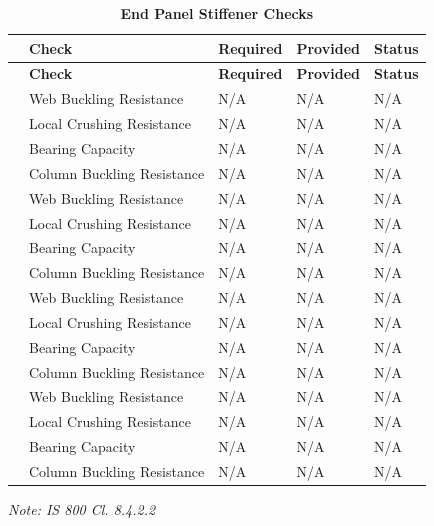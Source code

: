 \documentclass[12pt,a4paper]{report}
\numberwithin{table}{chapter}
\numberwithin{figure}{chapter}
\newcommand{\reportrowpad}{4pt}
\begin{document}
\begin{longtable}{|C{2.5cm}|L{3.5cm}|C{3.5cm}|>{\centering\arraybackslash}p{4.2cm}|C{1.8cm}|}
\caption{\textbf{End Panel Stiffener Checks}}\\
\hline
\textbf{} & \textbf{Check} & \textbf{Required} & \textbf{Provided} & \textbf{Status} \\[\reportrowpad]
\hline
\endfirsthead
\hline
\textbf{} & \textbf{Check} & \textbf{Required} & \textbf{Provided} & \textbf{Status} \\[\reportrowpad]
\hline
\endhead
{} & Web Buckling Resistance & N/A & N/A & N/A \\[\reportrowpad]
 & Local Crushing Resistance & N/A & N/A & N/A \\[\reportrowpad]
 & Bearing Capacity & N/A & N/A & N/A \\[\reportrowpad]
 & Column Buckling Resistance & N/A & N/A & N/A \\[\reportrowpad]
\hline
{} & Web Buckling Resistance & N/A & N/A & N/A \\[\reportrowpad]
 & Local Crushing Resistance & N/A & N/A & N/A \\[\reportrowpad]
 & Bearing Capacity & N/A & N/A & N/A \\[\reportrowpad]
 & Column Buckling Resistance & N/A & N/A & N/A \\[\reportrowpad]
\hline
{} & Web Buckling Resistance & N/A & N/A & N/A \\[\reportrowpad]
 & Local Crushing Resistance & N/A & N/A & N/A \\[\reportrowpad]
 & Bearing Capacity & N/A & N/A & N/A \\[\reportrowpad]
 & Column Buckling Resistance & N/A & N/A & N/A \\[\reportrowpad]
\hline
{} & Web Buckling Resistance & N/A & N/A & N/A \\[\reportrowpad]
 & Local Crushing Resistance & N/A & N/A & N/A \\[\reportrowpad]
 & Bearing Capacity & N/A & N/A & N/A \\[\reportrowpad]
 & Column Buckling Resistance & N/A & N/A & N/A \\[\reportrowpad]
\hline
\end{longtable}
\noindent\textit{Note: IS 800 Cl. 8.4.2.2}
\end{document}
